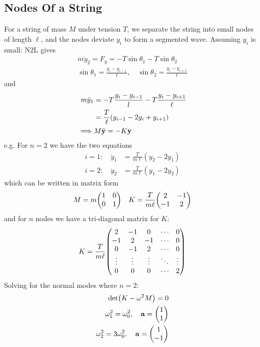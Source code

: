\documentclass[../main.tex]{subfiles}
\begin{document}
\subsection*{Nodes Of a String}
For a string of mass $M$ under tension $T$, we separate the string into small nodes of length
$\ell$, and the nodes deviate $y_i$ to form a segmented wave. Assuming $y_i$ is small: N2L gives
\begin{align*}
    m \ddot y_2 = F_y = -T \sin\theta_1 - T \sin\theta_2 \\
    \sin\theta_1 = \frac{y_i - y_{i-1}}{\ell}, \quad \sin\theta_2 = \frac{y_i - y_{i + 1}}{\ell}
\end{align*}
and
\begin{align*}
    m \ddot y_1 &= -T \frac{y_i - y_{i - 1}}{l} - T \frac{y_i - y_{i + 1}}{\ell} \\
    &= \frac{T}{\ell} (y_{i - 1} - 2y_i + y_{i + 1}) \\
    \implies &M \ddot{\vb y} = -K \vb y
\end{align*}
e.g. For $n = 2$ we have the two equations
\begin{align*}
    i = 1: \quad \ddot y_1 &= \frac{T}{m \ell} (y_2 - 2y_1) \\
    i = 2: \quad \ddot y_2 &= \frac{T}{m \ell} (y_1 - 2y_2)
\end{align*}
which can be written in matrix form
\begin{align*}
    M = m \mqty(1 & 0 \\ 0 & 1) \quad K = \frac{T}{m \ell} \mqty(2 & -1 \\ -1 & 2)
\end{align*}
and for $n$ nodes we have a tri-diagonal matrix for $K$:
\begin{align*}
    K = \frac{T}{m \ell} \mqty(2 & -1 & 0 & \cdots & 0 \\ -1 & 2 & -1 & \cdots & 0 \\ 0 & -1 & 2 & \cdots & 0 \\ \vdots & \vdots & \vdots & \ddots & \vdots \\ 0 & 0 & 0 & \cdots & 2)
\end{align*}
Solving for the normal modes where $n = 2$:
\begin{align*}
    \det(K - \omega^2 M) = 0 \\
    \omega_1^2 = \omega_0^2, \quad \vb a = \mqty(1 \\ 1) \\
    \omega_2^2 = 3\omega_0^2, \quad \vb a = \mqty(1 \\ -1)
\end{align*}
\end{document}
